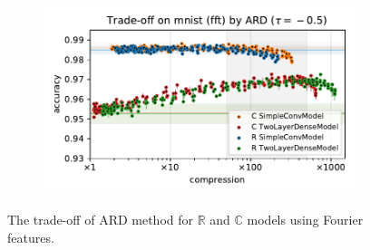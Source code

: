 \documentclass[a4paper,10pt,onecolumn]{article}
\newcommand{\real}{\mathbb{R}}
\newcommand{\cplx}{\mathbb{C}}
\begin{document}
\begin{figure}[b]
\begin{subfigure}[b]{0.5\columnwidth}
  \end{subfigure}%
  \begin{subfigure}[b]{0.5\columnwidth}
    \centering
    \includegraphics[width=\linewidth]{figure__mnist-like__trade-off/appendix__ARD__mnist__fft__-0.5.pdf}
  \end{subfigure}
  \caption{%
    The trade-off of ARD method for $\real$ and $\cplx$ models using Fourier features.
  }
  \label{fig:appendix__mnist-like__trade-off__ARD__fft}
\end{figure}
\end{document}
